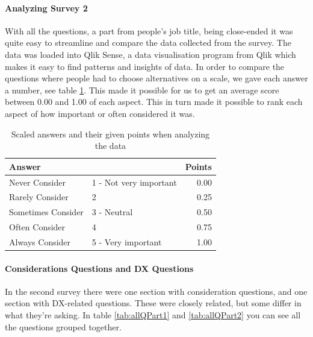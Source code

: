 \documentclass{article}
\begin{document}
\paragraph{Analyzing Survey 2}
With all the questions, a part from people's job title, being close-ended it was quite easy to streamline and compare the data collected from the survey. The data was loaded into Qlik Sense, a data visualisation program from Qlik which makes it easy to find patterns and insights of data. In order to compare the questions where people had to choose alternatives on a scale, we gave each answer a number, see table \ref{tabl:points}.
This made it possible for us to get an average score between 0.00 and 1.00 of each aspect. This in turn made it possible to rank each aspect of how important or often considered it was.
\begin{table}[H]
\centering
\begin{tabular}{l l|r}
\multicolumn{2}{l}{\textbf{Answer}} & \textbf{Points} \\ \hline
Never Consider & 1 - Not very important & 0.00  \\ \hline
Rarely Consider & 2 & 0.25 \\ \hline
Sometimes Consider & 3 - Neutral & 0.50 \\ \hline
Often Consider & 4 & 0.75 \\ \hline
Always Consider & 5 - Very important & 1.00 \\ \hline
\end{tabular}
\caption{Scaled answers and their given points when analyzing the data}
\label{tabl:points}
\end{table}

\paragraph{Considerations Questions and DX Questions}
In the second survey there were one section with consideration questions, and one section with DX-related questions. These were closely related, but some differ in what they're asking. In table \ref{tab:allQPart1} and \ref{tab:allQPart2} you can see all the questions grouped together.
\end{document}
